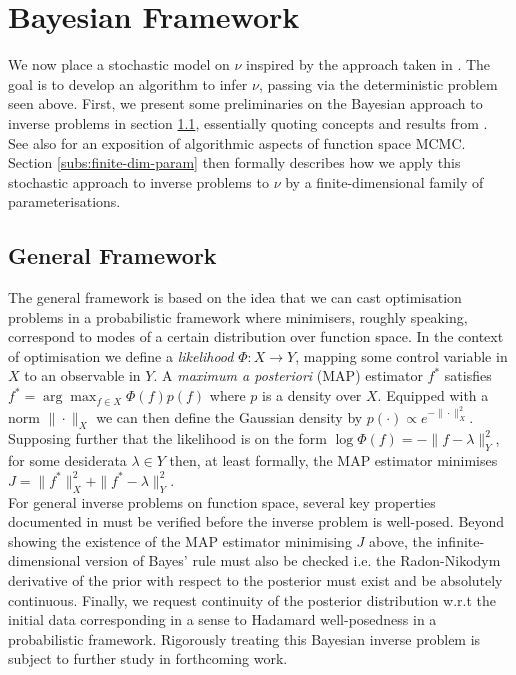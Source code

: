 \documentclass[runningheads]{llncs}
\begin{document}
\section{Bayesian Framework}\label{sec:bayesian}

We now place a stochastic model on $\nu$ inspired by the approach taken in
\cite{cotter2013bayesian}. The goal is to develop an algorithm to infer $\nu$,
passing via the deterministic problem seen above.  First, we present some
preliminaries on the Bayesian approach to inverse problems in section
\ref{subs:gf}, essentially quoting concepts and results from
\cite{dashti2017bayesian}. See also \cite{cotter2013mcmc} for an exposition of
algorithmic aspects of function space MCMC. Section \ref{subs:finite-dim-param}
then formally describes how we apply this stochastic approach to inverse
problems to $\nu$ by a finite-dimensional family of parameterisations.

\subsection{General Framework}\label{subs:gf}

The general framework is based on the idea that we can cast optimisation
problems in a probabilistic framework where minimisers, roughly speaking,
correspond to modes of a certain distribution over function space.  In the
context of optimisation we define a \emph{likelihood} $\Phi : X\rightarrow Y$,
mapping some control variable in $X$ to an observable in $Y$.  A \emph{maximum a
posteriori} (MAP) estimator $f^*$ satisfies $f^* = \arg\max_{f\in X} \Phi(f)
p(f)$ where $p$ is a density over $X$. Equipped with a norm $\|\cdot\|_X$ we can
then define the Gaussian density by $p(\cdot) \propto e^{-\|\cdot\|_X^2}$.
Supposing further that the likelihood is on the form $\log \Phi(f) =
-\|f-\lambda\|_Y^2$, for some desiderata $\lambda\in Y$ then, at least formally,
the MAP estimator minimises $J=\|f^*\|_X^2 + \|f^*-\lambda\|_Y^2$.\\

For general inverse problems on function space, several key properties
documented in \cite{dashti2017bayesian} must be verified before the
inverse problem is well-posed. Beyond showing the existence of the MAP estimator
minimising $J$ above, the infinite-dimensional version of Bayes' rule must also
be checked i.e. the Radon-Nikodym derivative of the prior with respect to the
posterior must exist and be absolutely continuous. Finally, we request
continuity of the posterior distribution w.r.t the initial data corresponding in
a sense to Hadamard well-posedness in a probabilistic framework. Rigorously
treating this Bayesian inverse problem is subject to further study in 
forthcoming work.
\end{document}
